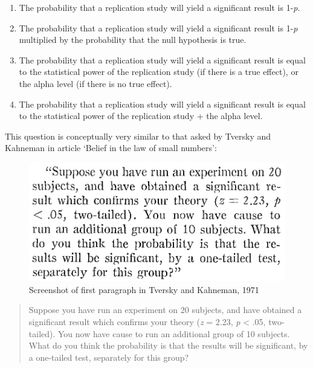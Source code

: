 \documentclass[
  oneside]{book}
\providecommand{\tightlist}{%
  \setlength{\itemsep}{0pt}\setlength{\parskip}{0pt}}
\begin{document}
\begin{enumerate}
\def\labelenumi{\Alph{enumi})}
\tightlist
\item
  The probability that a replication study will yield a significant result is 1-\emph{p}.
\item
  The probability that a replication study will yield a significant result is 1-\emph{p} multiplied by the probability that the null hypothesis is true.
\item
  The probability that a replication study will yield a significant result is equal to the statistical power of the replication study (if there is a true effect), or the alpha level (if there is no true effect).
\item
  The probability that a replication study will yield a significant result is equal to the statistical power of the replication study + the alpha level.
\end{enumerate}

This question is conceptually very similar to that asked by Tversky and Kahneman \citeyearpar{tversky_belief_1971} in article `Belief in the law of small numbers':

\begin{figure}

{\centering \includegraphics[width=1\linewidth]{images/belieflawsmallnumers} 

}

\caption{Screenshot of first paragraph in Tversky and Kahneman, 1971}\label{fig:smallnumbers}
\end{figure}

\begin{quote}
Suppose you have run an experiment on 20 subjects, and have obtained a significant result which confirms your theory (\emph{z} = 2.23, \emph{p} \textless{} .05, two-tailed). You now have cause to run an additional group of 10 subjects. What do you think the probability is that the results will be significant, by a one-tailed test, separately for this group?
\end{quote}
\end{document}
